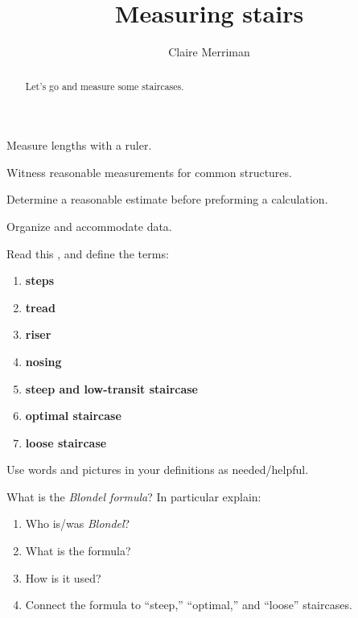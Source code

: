 \documentclass[handout,nooutcomes,noauthor,hints]{ximera}
\title{Measuring stairs}
\author{Claire Merriman}
\begin{document}
\begin{abstract}
  Let's go and measure some staircases.
\end{abstract}
\maketitle


\begin{listOutcomes}
\item Measure lengths with a ruler.
\item Witness reasonable measurements for common structures.
\item Determine a reasonable estimate before preforming a calculation.
\item Organize and accommodate data.
\end{listOutcomes}





\mynewpage


\begin{question}
Read this ,
and define the terms:
\begin{enumerate}
\item \textbf{steps}
\item \textbf{tread}
\item \textbf{riser}
\item \textbf{nosing}
\item \textbf{steep and low-transit staircase}
\item \textbf{optimal staircase}
\item \textbf{loose staircase}
\end{enumerate}
Use words and pictures in your definitions as needed/helpful.

\end{question}


\mynewpage

\begin{question}
  What is the \textit{Blondel formula}? In particular explain:
  \begin{enumerate}
  \item Who is/was \textit{Blondel}?
  \item What is the formula?
  \item How is it used?
  \item Connect the formula to ``steep,'' ``optimal,'' and ``loose''
    staircases.
  \end{enumerate}
\end{question}
\end{document}
